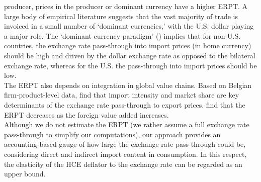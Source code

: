 \documentclass[12pt,a4paper]{paper}
\begin{document}
producer, prices in the producer or dominant currency have a higher ERPT.
A large body of empirical literature suggests that the vast majority of trade is invoiced in a small number of ‘dominant currencies,’ with the U.S. dollar playing a major role. 
The ‘dominant currency paradigm’ (\cite{Gopinath2020}) implies that for non-U.S. countries, the exchange rate pass-through into import prices (in home currency) should be high and driven by the dollar exchange rate as opposed to the bilateral exchange rate, whereas for the U.S. the pass-through into import prices should be low.\\
The ERPT also depends on integration in global value chains. 
Based on Belgian firm-product-level data, \cite{Amiti2014} find that import intensity and market share are key determinants of the exchange rate pass-through to
export prices.
\cite{DeSoyres2018} find that the ERPT decreases as the foreign value added increases. \\
Although we do not estimate the ERPT (we rather assume a full exchange rate pass-through to simplify our computations), our approach provides an accounting-based gauge of how large the exchange rate pass-through could be, considering direct and indirect import content in consumption. In this respect, the elasticity of the HCE deflator to the exchange rate can be regarded as an upper bound. \\

 
\end{document}
